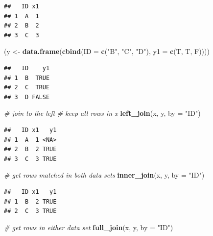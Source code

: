 \documentclass[12pt,]{krantz}
\makeatletter
\newenvironment{Shaded}{\begin{snugshade}}{\end{snugshade}}
\newcommand{\CommentTok}[1]{\textcolor[rgb]{0.37,0.37,0.37}{\textit{#1}}}
\newcommand{\DataTypeTok}[1]{\textcolor[rgb]{0.27,0.27,0.27}{#1}}
\newcommand{\KeywordTok}[1]{\textcolor[rgb]{0.27,0.27,0.27}{\textbf{#1}}}
\newcommand{\NormalTok}[1]{#1}
\newcommand{\StringTok}[1]{\textcolor[rgb]{0.5,0.5,0.5}{#1}}
\newenvironment{kframe}{%
\medskip{}
\setlength{\fboxsep}{.8em}
 \def\at@end@of@kframe{}%
 \ifinner\ifhmode%
  \def\at@end@of@kframe{\end{minipage}}%
  \begin{minipage}{\columnwidth}%
 \fi\fi%
 \def\FrameCommand##1{\hskip\@totalleftmargin \hskip-\fboxsep
 \colorbox{shadecolor}{##1}\hskip-\fboxsep
     \hskip-\linewidth \hskip-\@totalleftmargin \hskip\columnwidth}%
 \MakeFramed {\advance\hsize-\width
   \@totalleftmargin\z@ \linewidth\hsize
   \@setminipage}}%
 {\par\unskip\endMakeFramed%
 \at@end@of@kframe}
\renewenvironment{Shaded}{\begin{kframe}}{\end{kframe}}
\makeatother
\begin{document}
\begin{verbatim}
##   ID x1
## 1  A  1
## 2  B  2
## 3  C  3
\end{verbatim}

\begin{Shaded}
\begin{Highlighting}[]
\NormalTok{(y <-}\StringTok{ }\KeywordTok{data.frame}\NormalTok{(}\KeywordTok{cbind}\NormalTok{(}\DataTypeTok{ID =} \KeywordTok{c}\NormalTok{(}\StringTok{"B"}\NormalTok{, }\StringTok{"C"}\NormalTok{, }\StringTok{"D"}\NormalTok{), }\DataTypeTok{y1 =} \KeywordTok{c}\NormalTok{(T, T, F))))}
\end{Highlighting}
\end{Shaded}

\begin{verbatim}
##   ID    y1
## 1  B  TRUE
## 2  C  TRUE
## 3  D FALSE
\end{verbatim}

\begin{Shaded}
\begin{Highlighting}[]
\CommentTok{# join to the left}
\CommentTok{# keep all rows in x}
\KeywordTok{left_join}\NormalTok{(x, y, }\DataTypeTok{by =} \StringTok{"ID"}\NormalTok{)}
\end{Highlighting}
\end{Shaded}

\begin{verbatim}
##   ID x1   y1
## 1  A  1 <NA>
## 2  B  2 TRUE
## 3  C  3 TRUE
\end{verbatim}

\begin{Shaded}
\begin{Highlighting}[]
\CommentTok{# get rows matched in both data sets}
\KeywordTok{inner_join}\NormalTok{(x, y, }\DataTypeTok{by =} \StringTok{"ID"}\NormalTok{)}
\end{Highlighting}
\end{Shaded}

\begin{verbatim}
##   ID x1   y1
## 1  B  2 TRUE
## 2  C  3 TRUE
\end{verbatim}

\begin{Shaded}
\begin{Highlighting}[]
\CommentTok{# get rows in either data set}
\KeywordTok{full_join}\NormalTok{(x, y, }\DataTypeTok{by =} \StringTok{"ID"}\NormalTok{)}
\end{Highlighting}
\end{Shaded}
\end{document}
